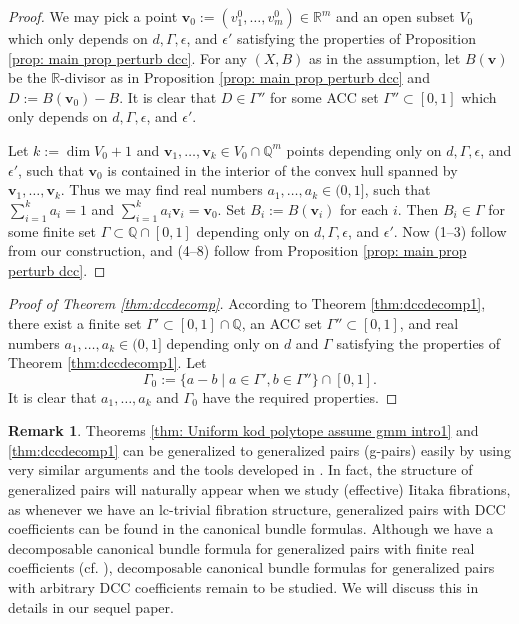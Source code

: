 \documentclass[11pt]{amsart}
\numberwithin{equation}{section}
\newcommand{\Qq}{\mathbb{Q}}
\newcommand{\Rr}{\mathbb{R}}
\newcommand{\Ii}{{\Gamma}}
\theoremstyle{definition}
\newtheorem{rem}[thm]{Remark}
\theoremstyle{definition}
\begin{document}
\begin{proof}
We may pick a point $\bm{v}_0:=(v^0_1,\dots,v^0_m)\in\Rr^m$ and an open subset $V_0$ which only depends on $d,\Ii,\epsilon$, and $\epsilon'$ satisfying the properties of Proposition \ref{prop: main prop perturb dcc}. For any $(X,B)$ as in the assumption, let $B(\bm{v})$ be the $\Rr$-divisor as in Proposition \ref{prop: main prop perturb dcc} and $D:=B(\bm{v}_0)-B$. It is clear that $D\in\Ii''$ for some ACC set $\Ii''\subset [0,1]$ which only depends on $d,\Ii,\epsilon$, and $\epsilon'$.

Let $k:=\dim V_0+1$ and $\bm{v}_1,\dots,\bm{v}_k\in V_0\cap\Qq^m$ points depending only on $d,\Ii,\epsilon$, and $\epsilon'$, such that $\bm{v}_0$ is contained in the interior of the convex hull spanned by $\bm{v}_1,\dots,\bm{v}_k$. Thus we may find real numbers $a_1,\dots,a_k\in (0,1]$, such that $\sum_{i=1}^ka_i=1$ and $\sum_{i=1}^ka_i\bm{v}_i=\bm{v}_0$. Set $B_i:=B(\bm{v}_i)$ for each $i$. Then $B_i\in\Ii$ for some finite set $\Ii\subset\Qq\cap[0,1]$ depending only on $d,\Ii,\epsilon$, and $\epsilon'$. Now (1--3) follow from our construction, and (4--8) follow from Proposition \ref{prop: main prop perturb dcc}.
\end{proof}
\begin{proof}[Proof of Theorem \ref{thm:dccdecomp}]
According to Theorem \ref{thm:dccdecomp1}, there exist a finite set $\Ii'\subset[0,1]\cap\Qq$, an ACC set $\Ii''\subset[0,1]$, and real numbers $a_1,\dots,a_k\in (0,1]$ depending only on $d$ and $\Ii$ satisfying the properties of Theorem \ref{thm:dccdecomp1}. Let
$$\Ii_0:=\{a-b\mid a\in\Ii',b\in\Ii''\}\cap[0,1].$$
It is clear that $a_1,\dots,a_k$ and $\Ii_0$ have the required properties.
\end{proof}


\begin{rem}
Theorems \ref{thm: Uniform kod polytope assume gmm intro1} and \ref{thm:dccdecomp1} can be generalized to generalized pairs (g-pairs) easily by using very similar arguments and the tools developed in \cite{BZ16,HL21a,HLi18}. In fact, the structure of generalized pairs will naturally appear when we study (effective) Iitaka fibrations, as whenever we have an lc-trivial fibration structure, generalized pairs with DCC coefficients can be found in the canonical bundle formulas. Although we have a decomposable canonical bundle formula for generalized pairs with finite real coefficients (cf. \cite{HL21b,HJL22,JLX22}), decomposable canonical bundle formulas for generalized pairs with arbitrary DCC coefficients remain to be studied.  We will discuss this in details in our sequel paper.
\end{rem}
\end{document}
